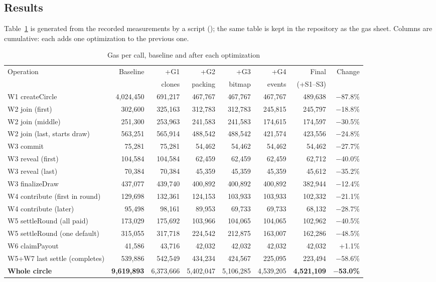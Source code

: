 \subsection{Results}
Table~\ref{tab:gas} is generated from the recorded measurements by a script
(); the same table is kept in the repository as the gas sheet. Columns are
cumulative: each adds one optimization to the previous one.

\begin{table}[H]
\centering\footnotesize
\setlength{\tabcolsep}{3.4pt}
\caption{Gas per call, baseline and after each optimization}
\label{tab:gas}
\begin{tabular}{@{}lrrrrrrr@{}}
\toprule
Operation & Baseline & +G1 & +G2 & +G3 & +G4 & Final & Change \\
 & & clones & packing & bitmap & events & (+S1--S3) & \\
\midrule
W1 createCircle & 4,024,450 & 691,217 & 467,767 & 467,767 & 467,767 & 489,638 & $-$87.8\% \\
W2 join (first) & 302,600 & 325,163 & 312,783 & 312,783 & 245,815 & 245,797 & $-$18.8\% \\
W2 join (middle) & 251,300 & 253,963 & 241,583 & 241,583 & 174,615 & 174,597 & $-$30.5\% \\
W2 join (last, starts draw) & 563,251 & 565,914 & 488,542 & 488,542 & 421,574 & 423,556 & $-$24.8\% \\
W3 commit & 75,281 & 75,281 & 54,462 & 54,462 & 54,462 & 54,462 & $-$27.7\% \\
W3 reveal (first) & 104,584 & 104,584 & 62,459 & 62,459 & 62,459 & 62,712 & $-$40.0\% \\
W3 reveal (last) & 70,384 & 70,384 & 45,359 & 45,359 & 45,359 & 45,612 & $-$35.2\% \\
W3 finalizeDraw & 437,077 & 439,740 & 400,892 & 400,892 & 400,892 & 382,944 & $-$12.4\% \\
W4 contribute (first in round) & 129,698 & 132,361 & 124,153 & 103,933 & 103,933 & 102,332 & $-$21.1\% \\
W4 contribute (later) & 95,498 & 98,161 & 89,953 & 69,733 & 69,733 & 68,132 & $-$28.7\% \\
W5 settleRound (all paid) & 173,029 & 175,692 & 103,966 & 104,065 & 104,065 & 102,962 & $-$40.5\% \\
W5 settleRound (one default) & 315,055 & 317,718 & 224,542 & 212,875 & 163,007 & 162,286 & $-$48.5\% \\
W6 claimPayout & 41,586 & 43,716 & 42,032 & 42,032 & 42,032 & 42,032 & +1.1\% \\
W5+W7 last settle (completes) & 539,886 & 542,549 & 434,234 & 424,567 & 225,095 & 223,494 & $-$58.6\% \\
\midrule
\textbf{Whole circle} & \textbf{9,619,893} & 6,373,666 & 5,402,047 & 5,106,285 & 4,539,205 & \textbf{4,521,109} & \textbf{$-$53.0\%} \\
\bottomrule
\end{tabular}
\end{table}

